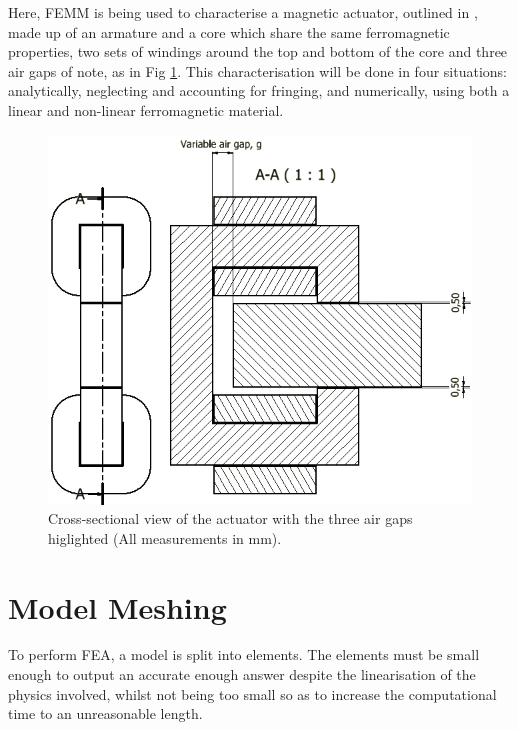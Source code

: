 \documentclass[a4paper]{IEEEtran}
\begin{document}
    Here, FEMM is being used to characterise a magnetic actuator, outlined in \cite{labPartA}, made up of an armature and a core which share the same ferromagnetic properties, two sets of windings around the top and bottom of the core and three air gaps of note, as in Fig \ref{xsection}. This characterisation will be done in four situations: analytically, neglecting and accounting for fringing, and numerically, using both a linear and non-linear ferromagnetic material. 

    \begin{figure}[ht]
        \includegraphics[width = \linewidth]{actuator-2.jpg}
        \caption{Cross-sectional view of the actuator with the three air gaps higlighted (All measurements in mm).}
        \label{xsection} 
    \end{figure}

\section{Model Meshing}

    To perform FEA, a model is split into elements. The elements must be small enough to output an accurate enough answer despite the linearisation of the physics involved, whilst not being too small so as to increase the computational time to an unreasonable length.
\end{document}
